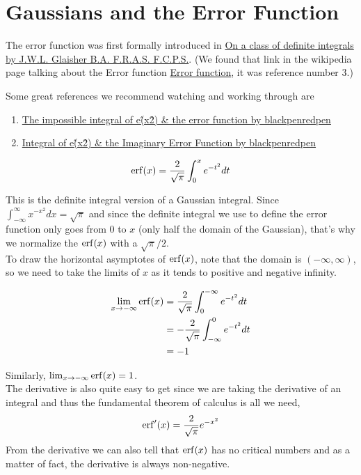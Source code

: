 \section{Gaussians and the Error Function}

The error function was first formally introduced in
\href{https://books.google.com/books?id=8Po7AQAAMAAJ&pg=RA1-PA294#v=onepage&q&f=false}{On a class of definite integrals by J.W.L. Glaisher B.A. F.R.A.S. F.C.P.S.}.
(We found that link in the wikipedia page talking about the Error function
\href{https://en.wikipedia.org/wiki/Error_function}{Error function}, it was reference number 3.)

Some great references we recommend watching and working through are
\begin{enumerate}
\item \href{https://www.youtube.com/watch?v=jkytxdedxhU}{The impossible integral of e\^ (x\^ 2) \& the error function by blackpenredpen}
\item \href{https://www.youtube.com/watch?v=zorcLisjRUI}{Integral of e\^(x\^2) \& the Imaginary Error Function by blackpenredpen}
\end{enumerate}

$$
\operatorname{erf}(x) = \frac{2}{\sqrt{\pi}} \int_{0}^{x} e^{-t^2} dt
$$

This is the definite integral version of a Gaussian integral.
Since $\int_{-\infty}^{\infty} x^{-x^2} dx = \sqrt{\pi}$ and since the definite integral we use to define the
error function only goes from 0 to $x$ (only half the domain of the Gaussian),
that's why we normalize the $\operatorname{erf}(x)$ with a $\sqrt{\pi}/2$.
\\

To draw the horizontal asymptotes of $\operatorname{erf}(x)$, note that the domain is $\left(-\infty, \infty\right)$, so we need to take the
limits of $x$ as it tends to positive and negative infinity.

\begin{align*}
\lim_{x\rightarrow -\infty} \operatorname{erf}(x) &= \frac{2}{\sqrt{\pi}} \int_{0}^{-\infty} e^{-t^2} dt \\
&= - \frac{2}{\sqrt{\pi}} \int_{-\infty}^{0} e^{-t^2} dt \\
&= -1
\end{align*}

Similarly, $\lim_{x\rightarrow -\infty} \operatorname{erf}(x) = 1$.
\\

The derivative is also quite easy to get since we are taking the derivative of an integral and thus the fundamental theorem of calculus
is all we need,
$$
\operatorname{erf}^{\prime} (x) = \frac{2}{\sqrt{\pi}} e^{-x^2}
$$
From the derivative we can also tell that $\operatorname{erf}(x)$ has no critical numbers and as a matter of fact, the derivative is always non-negative.

